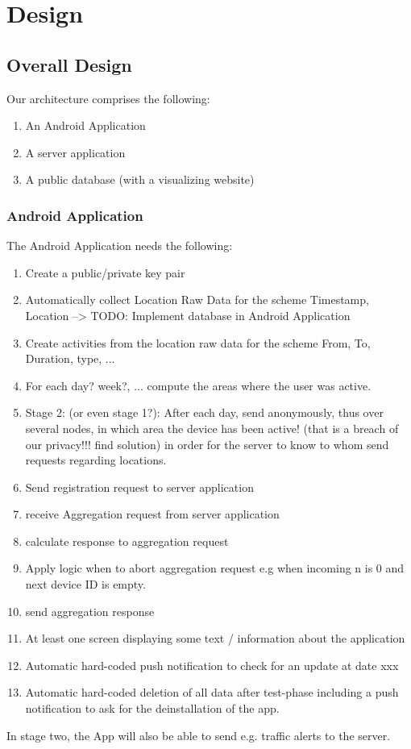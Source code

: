 \chapter{Design}\label{chapter:analysis}

\section{Overall Design}
Our architecture comprises the following:
\begin{enumerate}
	\item An Android Application
	\item A server application
	\item A public database (with a visualizing website)
\end{enumerate}

\subsection{Android Application}
The Android Application needs the following:
\begin{enumerate}
	\item Create a public/private key pair
	\item Automatically collect Location Raw Data for the scheme {Timestamp, Location} --> TODO: Implement database in Android Application
	\item Create activities from the location raw data for the scheme {From, To, Duration, type, ...}
	\item For each day? week?, ... compute the areas where the user was active.
	\item Stage 2: (or even stage 1?): After each day, send anonymously, thus over several nodes, in which area the device has been active! (that is a breach of our privacy!!! find solution) in order for the server to know to whom send requests regarding locations.
	\item Send registration request to server application
	\item receive Aggregation request from server application
	\item calculate response to aggregation request
	\item Apply logic when to abort aggregation request e.g when incoming n is 0 and next device ID is empty.
	\item send aggregation response
	\item At least one screen displaying some text / information about the application
	\item Automatic hard-coded push notification to check for an update at date xxx
	\item Automatic hard-coded deletion of all data after test-phase including a push notification to ask for the deinstallation of the app.
\end{enumerate}
In stage two, the App will also be able to send e.g. traffic alerts to the server.

